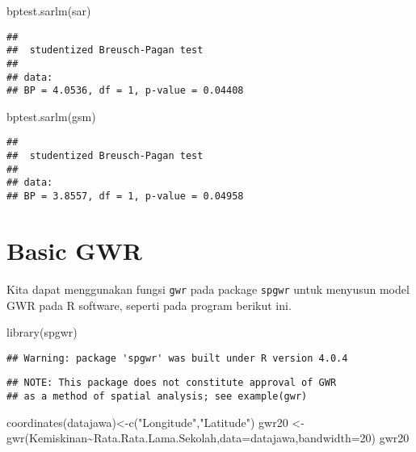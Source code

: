 \documentclass[
]{book}
\newenvironment{Shaded}{\begin{snugshade}}{\end{snugshade}}
\newcommand{\AttributeTok}[1]{\textcolor[rgb]{0.77,0.63,0.00}{#1}}
\newcommand{\DecValTok}[1]{\textcolor[rgb]{0.00,0.00,0.81}{#1}}
\newcommand{\FunctionTok}[1]{\textcolor[rgb]{0.00,0.00,0.00}{#1}}
\newcommand{\NormalTok}[1]{#1}
\newcommand{\OtherTok}[1]{\textcolor[rgb]{0.56,0.35,0.01}{#1}}
\newcommand{\SpecialCharTok}[1]{\textcolor[rgb]{0.00,0.00,0.00}{#1}}
\newcommand{\StringTok}[1]{\textcolor[rgb]{0.31,0.60,0.02}{#1}}
\begin{document}
\begin{Shaded}
\begin{Highlighting}[]
\FunctionTok{bptest.sarlm}\NormalTok{(sar)}
\end{Highlighting}
\end{Shaded}

\begin{verbatim}
## 
##  studentized Breusch-Pagan test
## 
## data:  
## BP = 4.0536, df = 1, p-value = 0.04408
\end{verbatim}

\begin{Shaded}
\begin{Highlighting}[]
\FunctionTok{bptest.sarlm}\NormalTok{(gsm)}
\end{Highlighting}
\end{Shaded}

\begin{verbatim}
## 
##  studentized Breusch-Pagan test
## 
## data:  
## BP = 3.8557, df = 1, p-value = 0.04958
\end{verbatim}

\hypertarget{basic-gwr}{%
\section{Basic GWR}\label{basic-gwr}}

Kita dapat menggunakan fungsi \texttt{gwr} pada package \texttt{spgwr} untuk menyusun model GWR pada R software, seperti pada program berikut ini.

\begin{Shaded}
\begin{Highlighting}[]
\FunctionTok{library}\NormalTok{(spgwr)}
\end{Highlighting}
\end{Shaded}

\begin{verbatim}
## Warning: package 'spgwr' was built under R version 4.0.4
\end{verbatim}

\begin{verbatim}
## NOTE: This package does not constitute approval of GWR
## as a method of spatial analysis; see example(gwr)
\end{verbatim}

\begin{Shaded}
\begin{Highlighting}[]
\FunctionTok{coordinates}\NormalTok{(datajawa)}\OtherTok{\textless{}{-}}\FunctionTok{c}\NormalTok{(}\StringTok{"Longitude"}\NormalTok{,}\StringTok{"Latitude"}\NormalTok{)}
\NormalTok{gwr20 }\OtherTok{\textless{}{-}} \FunctionTok{gwr}\NormalTok{(Kemiskinan}\SpecialCharTok{\textasciitilde{}}\NormalTok{Rata.Rata.Lama.Sekolah,}\AttributeTok{data=}\NormalTok{datajawa,}\AttributeTok{bandwidth=}\DecValTok{20}\NormalTok{)}
\NormalTok{gwr20}
\end{Highlighting}
\end{Shaded}
\end{document}
